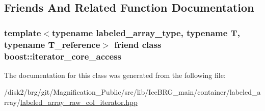 \subsection{Friends And Related Function Documentation}
\hypertarget{classIceBRG_1_1labeled__array__raw__col__iterator_ac09f73e325921cc50ebcd96bed0f8096}{}
\subsubsection[{boost\+::iterator\+\_\+core\+\_\+access}]{\setlength{\rightskip}{0pt plus 5cm}template$<$typename labeled\+\_\+array\+\_\+type, typename T, typename T\+\_\+reference$>$ friend class boost\+::iterator\+\_\+core\+\_\+access\hspace{0.3cm}{\ttfamily [friend]}}\label{classIceBRG_1_1labeled__array__raw__col__iterator_ac09f73e325921cc50ebcd96bed0f8096}


The documentation for this class was generated from the following file\+:\begin{DoxyCompactItemize}
\item 
/disk2/brg/git/\+Magnification\+\_\+\+Public/src/lib/\+Ice\+B\+R\+G\+\_\+main/container/labeled\+\_\+array/\hyperlink{labeled__array__raw__col__iterator_8hpp}{labeled\+\_\+array\+\_\+raw\+\_\+col\+\_\+iterator.\+hpp}\end{DoxyCompactItemize}

